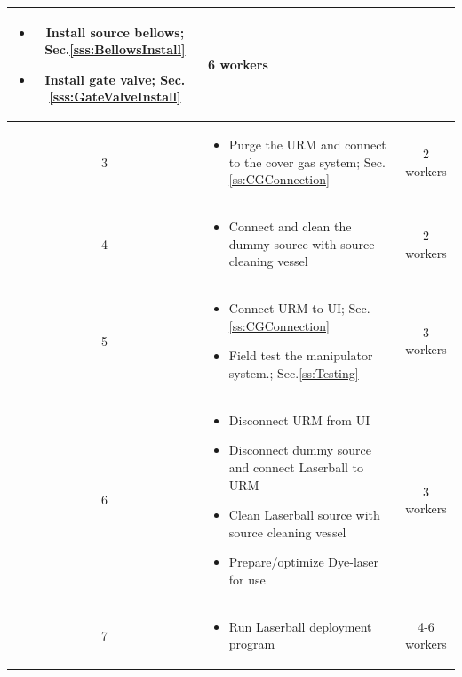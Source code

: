 \documentclass[11pt]{article}
\begin{document}
\begin{table}
\begin{tabular}{|c|p{13cm}|c|}
\begin{itemize}[label={$\square$}]
    \item Install source bellows; Sec.\ref{sss:BellowsInstall}
    \item Install gate valve; Sec.\ref{sss:GateValveInstall}
    \end{itemize} \vspace{-0.5cm} 
    & 6 workers \\ \hline
    3 & \vspace{-0.7cm} \begin{itemize}[label={$\square$}]
    \item Purge the URM and connect to the cover gas system; Sec.\ref{ss:CGConnection}
    \end{itemize} \vspace{-0.5cm} 
    & 2 workers \\\hline
    4 & \vspace{-0.7cm} \begin{itemize}[label={$\square$}]
    \item Connect and clean the dummy source with source cleaning vessel
    \end{itemize} \vspace{-0.5cm} 
    & 2 workers \\\hline
    5 &  \vspace{-0.7cm} \begin{itemize}[label={$\square$}]
    \item Connect URM to UI; Sec.\ref{ss:CGConnection}
    \item Field test the manipulator system.; Sec.\ref{ss:Testing}
    \end{itemize} \vspace{-0.5cm} 
    & 3 workers \\
    6 & \vspace{-0.7cm} \begin{itemize}[label={$\square$}]
    \item Disconnect URM from UI
    \item Disconnect dummy source and connect Laserball to URM
    \item Clean Laserball source with source cleaning vessel
    \item Prepare/optimize Dye-laser for use
    \end{itemize} \vspace{-0.5cm} 
    & 3 workers \\ \hline
    7 & \vspace{-0.7cm} \begin{itemize}[label={$\square$}]
    \item Run Laserball deployment program
    \end{itemize} \vspace{-0.5cm} 
    & 4-6 workers \\\hline
  \end{tabular}
  \label{tab:blockSchedule}
\end{table}
\end{document}
